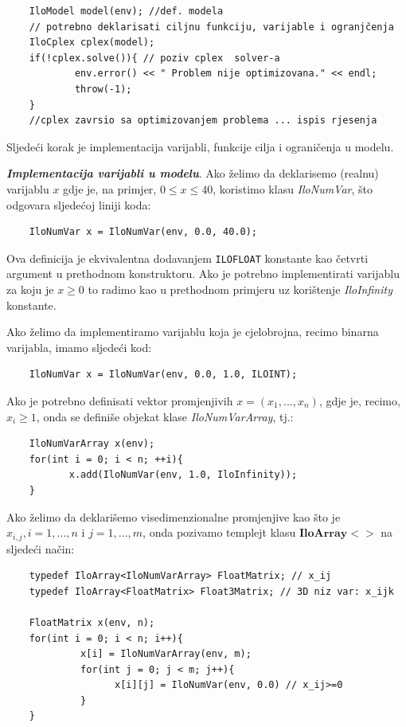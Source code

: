 \documentclass[a4paper, utf8, 11pt, colorlinks]{book}
\theoremstyle{definition}
\begin{document}
 \begin{verbatim}
 	IloModel model(env); //def. modela
 	// potrebno deklarisati ciljnu funkciju, varijable i ogranjčenja
 	IloCplex cplex(model);
 	if(!cplex.solve()){ // poziv cplex  solver-a
 		    env.error() << " Problem nije optimizovana." << endl;
 		    throw(-1);
 	}
 	//cplex zavrsio sa optimizovanjem problema ... ispis rjesenja
 \end{verbatim}
 
 \noindent Sljedeći korak je implementacija varijabli, funkcije cilja i ograničenja u modelu. 
 
 \noindent \textbf{\emph{Implementacija varijabli u modelu}}. Ako želimo da deklarisemo (realnu) varijablu $x$ gdje je, na primjer, $0 \leq x \leq 40$, koristimo klasu \emph{IloNumVar}, što odgovara sljedećoj liniji koda:
 \begin{verbatim}
 	IloNumVar x = IloNumVar(env, 0.0, 40.0);
 \end{verbatim}
 Ova definicija je ekvivalentna dodavanjem  \texttt{ILOFLOAT} konstante kao četvrti argument u prethodnom konstruktoru. 
Ako je potrebno implementirati varijablu za koju je $x \geq 0$ to radimo kao u prethodnom primjeru uz korištenje  \emph{IloInfinity} konstante.
 
 Ako želimo da implementiramo varijablu koja je cjelobrojna, recimo binarna varijabla, imamo sljedeći kod:
 \begin{verbatim}
 	IloNumVar x = IloNumVar(env, 0.0, 1.0, ILOINT);
 \end{verbatim}
 
 \noindent Ako je potrebno definisati vektor promjenjivih $x=(x_1,...,x_n)$, gdje je, recimo, $x_i \geq 1$, onda se definiše objekat klase \emph{IloNumVarArray}, tj.:
 \begin{verbatim}
 	IloNumVarArray x(env);
 	for(int i = 0; i < n; ++i){
 		   x.add(IloNumVar(env, 1.0, IloInfinity));
 	}
 \end{verbatim}
 
 \noindent Ako želimo da deklarišemo visedimenzionalne promjenjive kao što je $x_{i,j}, i=1,...,n$ i $j=1,...,m$, onda pozivamo templejt klasu $\textbf{IloArray}<>$ na sljedeći način:
 
 \begin{verbatim}
 	typedef IloArray<IloNumVarArray> FloatMatrix; // x_ij 
 	typedef IloArray<FloatMatrix> Float3Matrix; // 3D niz var: x_ijk
 	
 	FloatMatrix x(env, n);
 	for(int i = 0; i < n; i++){
 		     x[i] = IloNumVarArray(env, m);
 		     for(int j = 0; j < m; j++){
 		  	       x[i][j] = IloNumVar(env, 0.0) // x_ij>=0
 		     }
 	}
 \end{verbatim}
 
\end{document}
